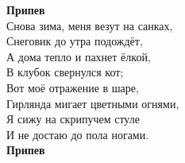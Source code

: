 \documentclass[fleqn,a5paper,12pt,twoside]{guitartabs}
\begin{document}
    \-\hspace{10mm}\textbf{Припев}\\
  
    Снова зима, меня везут на санках,\\
    Снеговик до утра подождёт,\\
    А дома тепло и пахнет ёлкой,\\
    В клубок свернулся кот;\\
    Вот моё отражение в шаре,\\
    Гирлянда мигает цветными огнями,\\
    Я сижу на скрипучем стуле\\
    И не достаю до пола ногами.\\
    
    \-\hspace{10mm}\textbf{Припев}
\newpage
{}%
\end{document}
